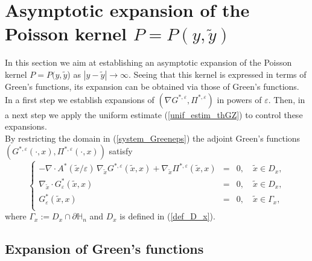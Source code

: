 \documentclass[11pt, reqno]{amsart}
\theoremstyle{definition}
\theoremstyle{remark}
\numberwithin{equation}{section}
\begin{document}
	\section{Asymptotic expansion of the Poisson kernel $P=P(y,\tilde{y})$}\label{section_expans}
	\noindent 	In this section we aim at establishing an asymptotic expansion of the Poisson kernel $P=P(y,\tilde{y}$)  as $|y-\tilde{y}|\rightarrow \infty$. Seeing that this kernel is expressed in terms of  Green's functions, its expansion can be obtained via those of Green's functions. In a first step we establish expansions of 	$(\nabla G^{*,\varepsilon},\Pi^{*,\varepsilon})$ in powers of $\varepsilon$. Then, in a next step we apply the uniform estimate (\ref{unif_estim_thGZ})  to control these expansions.\\
	
	
	\noindent By restricting the domain  in (\ref{system_Greeneps})  the adjoint Green's functions 
	$(G^{*,\varepsilon}(\cdot, x),\Pi^{*,\varepsilon}(\cdot, x))$  satisfy 
	\begin{equation}\label{probGreenD}
		\left\{	\begin{array}{rcl}
			-\nabla\cdot A^* (\tilde{x}/\varepsilon) \, \nabla_{\tilde{x}} G^{*,\varepsilon}(\tilde{x},x) +  \nabla_{\tilde{x}} \Pi^{*,\varepsilon}(\tilde{x},x)&=& 0,  \quad \tilde{x}\in D_x,\\
			\nabla_{\tilde{x}} \cdot G^*_\varepsilon(\tilde{x},x)&=& 0,  \quad \tilde{x}\in D_x,\\
			G^*_\varepsilon(\tilde{x},x)&=& 0  ,  \quad \tilde{x}\in \Gamma_x,\\
		\end{array}
		\right. 
	\end{equation}
	where $\Gamma_x :=  D_x \cap\partial\mathbb{H}_n$ and $D_x$ is defined in (\ref{def_D_x}).
	
	\subsection {Expansion of  Green's functions}
	
	\newcommand{\pbar}{	\overline{p}^{*,\beta}_j}
	
\end{document}
